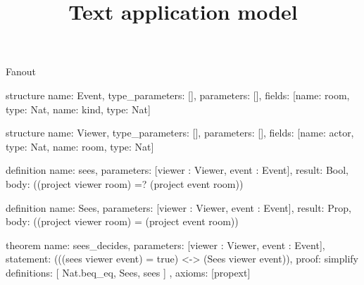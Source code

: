 \begin{lexlean}{Fanout}
\title{Text application model}
\begin{semanticmodule}
structure{
  name: Event,
  type_parameters: [],
  parameters: [],
  fields: [{name: room, type: Nat}, {name: kind, type: Nat}]
}

structure{
  name: Viewer,
  type_parameters: [],
  parameters: [],
  fields: [{name: actor, type: Nat}, {name: room, type: Nat}]
}

definition{
  name: sees,
  parameters: [viewer : Viewer, event : Event],
  result: Bool,
  body: ((project viewer room) =? (project event room))
}

definition{
  name: Sees,
  parameters: [viewer : Viewer, event : Event],
  result: Prop,
  body: ((project viewer room) = (project event room))
}

theorem{
  name: sees_decides,
  parameters: [viewer : Viewer, event : Event],
  statement: (((sees viewer event) = true) <-> (Sees viewer event)),
  proof: simplify{
    definitions: [
      Nat.beq_eq,
      Sees,
      sees
    ]
  },
  axioms: [propext]
}
\end{semanticmodule}
\end{lexlean}
